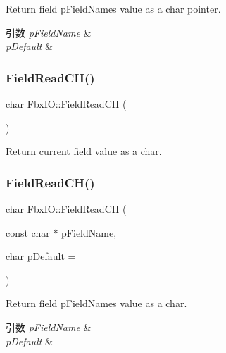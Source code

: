 Return field p\+Field\+Name\textquotesingle{}s value as a char pointer. 
\begin{DoxyParams}{引数}
{\em p\+Field\+Name} & \\
\hline
{\em p\+Default} & \\
\hline
\end{DoxyParams}
\mbox{\label{class_fbx_i_o_a71586431ebc531843b96971bb2c0911f}} 
\subsubsection{\texorpdfstring{Field\+Read\+C\+H()}{FieldReadCH()}\hspace{0.1cm}{\footnotesize\ttfamily [1/2]}}
{\footnotesize\ttfamily char Fbx\+I\+O\+::\+Field\+Read\+CH (\begin{DoxyParamCaption}{ }\end{DoxyParamCaption})}



Return current field value as a char. 

\mbox{\label{class_fbx_i_o_a0eb47742cf83d721054efcb5c2f361c6}} 
\subsubsection{\texorpdfstring{Field\+Read\+C\+H()}{FieldReadCH()}\hspace{0.1cm}{\footnotesize\ttfamily [2/2]}}
{\footnotesize\ttfamily char Fbx\+I\+O\+::\+Field\+Read\+CH (\begin{DoxyParamCaption}\item[{const char $\ast$}]{p\+Field\+Name,  }\item[{char}]{p\+Default = {} }\end{DoxyParamCaption})}

Return field p\+Field\+Name\textquotesingle{}s value as a char. 
\begin{DoxyParams}{引数}
{\em p\+Field\+Name} & \\
\hline
{\em p\+Default} & \\
\hline
\end{DoxyParams}
\mbox{\label{class_fbx_i_o_ad6d23cd45fa0a0f9867afe6d4bba6671}} 
